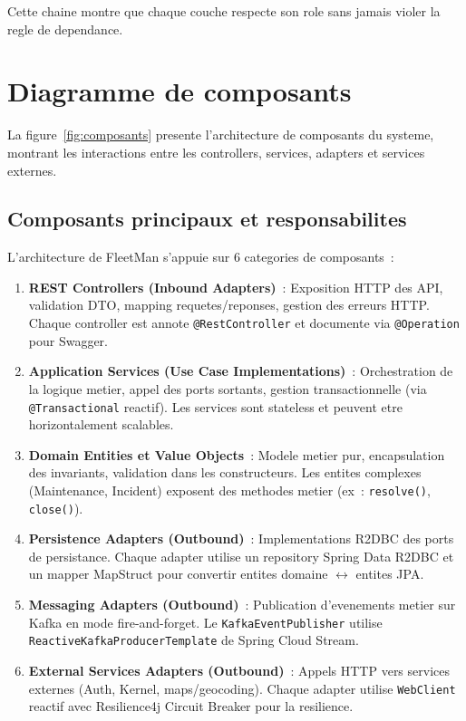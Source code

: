 \documentclass[12pt,a4paper]{report}
\begin{document}
Cette chaine montre que chaque couche respecte son role sans jamais
violer la regle de dependance.

\section{Diagramme de composants}

La figure~\ref{fig:composants} presente l'architecture de composants
du systeme, montrant les interactions entre les controllers, services,
adapters et services externes.

\subsection{Composants principaux et responsabilites}

L'architecture de FleetMan s'appuie sur 6 categories de composants~:

\begin{enumerate}[leftmargin=2cm]
  \item \textbf{REST Controllers (Inbound Adapters)}~: Exposition HTTP des
        API, validation DTO, mapping requetes/reponses, gestion des erreurs
        HTTP. Chaque controller est annote \texttt{@RestController} et
        documente via \texttt{@Operation} pour Swagger.
        
  \item \textbf{Application Services (Use Case Implementations)}~: Orchestration
        de la logique metier, appel des ports sortants, gestion transactionnelle
        (via \texttt{@Transactional} reactif). Les services sont stateless
        et peuvent etre horizontalement scalables.
        
  \item \textbf{Domain Entities et Value Objects}~: Modele metier pur,
        encapsulation des invariants, validation dans les constructeurs.
        Les entites complexes (Maintenance, Incident) exposent des methodes
        metier (ex~: \texttt{resolve()}, \texttt{close()}).
        
  \item \textbf{Persistence Adapters (Outbound)}~: Implementations R2DBC
        des ports de persistance. Chaque adapter utilise un repository
        Spring Data R2DBC et un mapper MapStruct pour convertir
        entites domaine $\leftrightarrow$ entites JPA.
        
  \item \textbf{Messaging Adapters (Outbound)}~: Publication d'evenements
        metier sur Kafka en mode fire-and-forget. Le \texttt{KafkaEventPublisher}
        utilise \texttt{ReactiveKafkaProducerTemplate} de Spring Cloud Stream.
        
  \item \textbf{External Services Adapters (Outbound)}~: Appels HTTP vers
        services externes (Auth, Kernel, maps/geocoding). Chaque adapter
        utilise \texttt{WebClient} reactif avec Resilience4j Circuit Breaker
        pour la resilience.
\end{enumerate}
\end{document}
